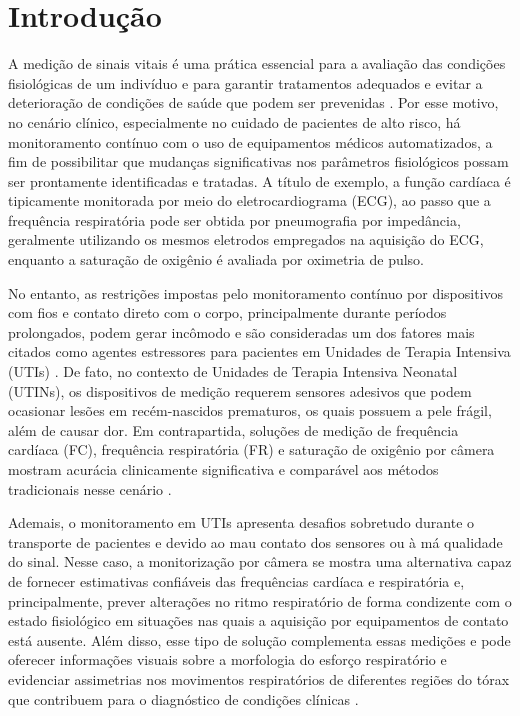 \chapter{Introdução}
\label{intro}

A medição de sinais vitais é uma prática essencial para a avaliação das condições fisiológicas de um indivíduo e para garantir tratamentos adequados e evitar a deterioração de condições de saúde que podem ser prevenidas \cite{elliott2012vitalsigns}. Por esse motivo, no cenário clínico, especialmente no cuidado de pacientes de alto risco, há monitoramento contínuo com o uso de equipamentos médicos automatizados, a fim de possibilitar que mudanças significativas nos parâmetros fisiológicos possam ser prontamente identificadas e tratadas. A título de exemplo, a função cardíaca é tipicamente monitorada por meio do eletrocardiograma (ECG), ao passo que a frequência respiratória pode ser obtida por pneumografia por impedância, geralmente utilizando os mesmos eletrodos empregados na aquisição do ECG, enquanto a saturação de oxigênio é avaliada por oximetria de pulso. 

No entanto, as restrições impostas pelo monitoramento contínuo por dispositivos com fios e contato direto com o corpo, principalmente durante períodos prolongados, podem gerar incômodo e são consideradas um dos fatores mais citados como agentes estressores para pacientes em Unidades de Terapia Intensiva (UTIs) \cite{ede2021ICUhumanfactors}. De fato, no contexto de Unidades de Terapia Intensiva Neonatal (UTINs), os dispositivos de medição requerem sensores adesivos que podem ocasionar lesões em recém-nascidos prematuros, os quais possuem a pele frágil, além de causar dor. Em contrapartida, soluções de medição de frequência cardíaca (FC), frequência respiratória (FR) e saturação de oxigênio  por câmera mostram acurácia clinicamente significativa e comparável aos métodos tradicionais nesse cenário \cite{villarroel2014neonatal}. 

Ademais, o monitoramento em UTIs apresenta desafios sobretudo durante o transporte de pacientes e devido ao mau contato dos sensores ou à má qualidade do sinal. Nesse caso, a monitorização por câmera se mostra uma alternativa capaz de fornecer estimativas confiáveis das frequências cardíaca e respiratória e, principalmente, prever alterações no ritmo respiratório de forma condizente com o estado fisiológico em situações nas quais a aquisição por equipamentos de contato está ausente. Além disso, esse tipo de solução complementa essas medições e pode oferecer informações visuais sobre a morfologia do esforço respiratório e evidenciar assimetrias nos movimentos respiratórios de diferentes regiões do tórax que contribuem para o diagnóstico de condições clínicas \cite{jorge2022postOpICU}.

